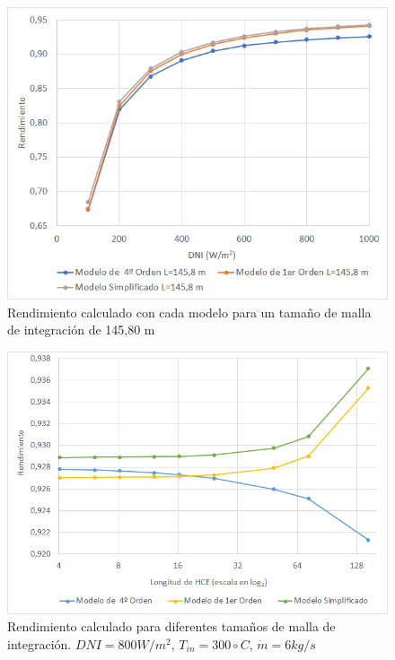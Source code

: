 \begin{figure}[!h]
\includegraphics[width=0.9\linewidth]{images/malla14580.png}
\caption{Rendimiento calculado con cada modelo para un tamaño de malla de integración de 145,80 m} 
\label{fig:malla14580}
\end{figure}


\begin{figure}[!h]
\includegraphics[width=0.9\linewidth]{images/malla_variable_DNI_800.png}
\caption{Rendimiento calculado para diferentes tamaños de malla de integración. $DNI=800 W/m^2$, $T_{in}=300 \circ C$, $\dot m = 6 kg/s$} 
\label{fig:malla_variable_DNI_800}
\end{figure}


